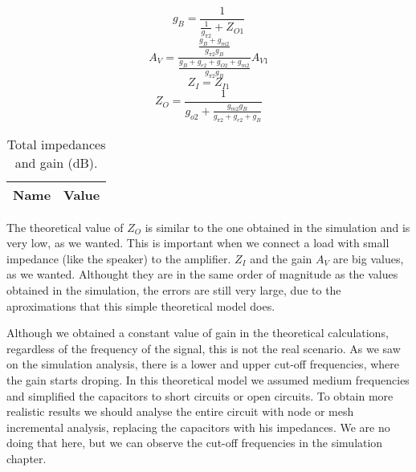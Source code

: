 \begin{equation}
g_B = \frac{1}{\frac{1}{g_{\pi 2}}+Z_{O1}}
\end{equation}
\begin{equation}
A_V = \frac{\frac{g_B+g_{m2}}{g_{\pi 2}g_B}}{\frac{g_B+g_{e2}+g_{O2}+g_{m2}}{g_{\pi 2}g_B}}A_{V1}
\end{equation}
\begin{equation}
Z_I=Z_{I1}
\end{equation}
\begin{equation}
Z_O=\frac{1}{g_{o2}+\frac{g_{m2}g_B}{g_{\pi 2}+g_{e2}+g_B}}
\end{equation}

 \begin{table}[H]
    \centering
    \begin{tabular}{|l|r|}
    \hline    
    {\bf Name} & {\bf Value} \\ \hline
    
    \end{tabular}
     \caption{Total impedances and gain (dB).}
    \label{tab:tot}
  \end{table}

\par The theoretical value of $Z_O$ is similar to the one obtained in the simulation and is very low, as we wanted. This is important when we connect a load with small impedance (like the speaker) to the amplifier. $Z_I$ and the gain $A_V$ are big values, as we wanted. Althought they are in the same order of magnitude as the values obtained in the simulation, the errors are still very large, due to the aproximations that this simple theoretical model does.

\par Although we obtained a constant value of gain in the theoretical calculations, regardless of the frequency of the signal, this is not the real scenario. As we saw on the simulation analysis, there is a lower and upper cut-off frequencies, where the gain starts droping. In this theoretical model we assumed medium frequencies and simplified the capacitors to short circuits or open circuits. To obtain more realistic results we should analyse the entire circuit with node or mesh incremental analysis, replacing the capacitors with his impedances. We are no doing that here, but we can observe the cut-off frequencies in the simulation chapter. 

